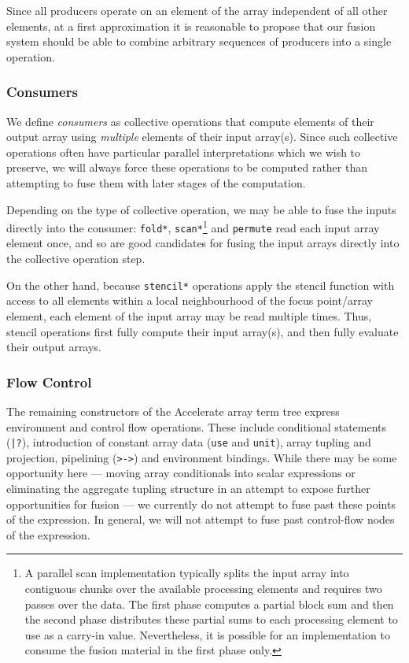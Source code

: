 Since all producers operate on an element of the array independent of all other
elements, at a first approximation it is reasonable to propose that our fusion
system should be able to combine arbitrary sequences of producers into a single
operation.


\subsubsection{Consumers}

We define \emph{consumers} as collective operations that compute
elements of their output array using \emph{multiple} elements of their input
array(s). Since such collective operations often have particular parallel
interpretations which we wish to preserve, we will always force these operations
to be computed rather than attempting to fuse them with later stages of the
computation.

Depending on the type of collective operation, we may be able to fuse the inputs
directly into the consumer: \texttt{fold*}, \texttt{scan*}\footnote{A parallel
scan implementation typically splits the input array into contiguous chunks over
the available processing elements and requires two passes over the data. The
first phase computes a partial block sum and then the second phase distributes
these partial sums to each processing element to use as a carry-in value.
Nevertheless, it is possible for an implementation to consume the fusion
material in the first phase only.} and \texttt{permute} read each input array
element once, and so are good candidates for fusing the input arrays directly
into the collective operation step.

On the other hand, because \texttt{stencil*} operations apply the stencil
function with access to all elements within a local neighbourhood of the focus
point/array element, each element of the input array may be read multiple times.
Thus, stencil operations first fully compute their input array(s), and then
fully evaluate their output arrays.


\subsubsection{Flow Control}

The remaining constructors of the Accelerate array term tree express environment
and control flow operations. These include conditional statements
(\texttt{|?}), introduction of constant array data (\texttt{use} and
\texttt{unit}), array tupling and projection, pipelining (\texttt{>->}) and
environment bindings. While there may be some opportunity here --- moving array
conditionals into scalar expressions or eliminating the aggregate tupling
structure in an attempt to expose further opportunities for fusion --- we
currently do not attempt to fuse past these points of the expression. In
general, we will not attempt to fuse past control-flow nodes of the expression.

